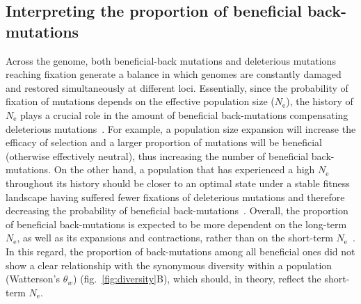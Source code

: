 \documentclass{article}
\newcommand{\Ne}{N_{\text{e}}}
\begin{document}
    \subsection*{Interpreting the proportion of beneficial back-mutations}

    Across the genome, both beneficial-back mutations and deleterious mutations reaching fixation generate a balance in which genomes are constantly damaged and restored simultaneously at different loci.
    Essentially, since the probability of fixation of mutations depends on the effective population size ($\Ne$), the history of $\Ne$ plays a crucial role in the amount of beneficial back-mutations compensating deleterious mutations~\cite{latrille_inferring_2021}.
    For example, a population size expansion will increase the efficacy of selection and a larger proportion of mutations will be beneficial (otherwise effectively neutral), thus increasing the number of beneficial back-mutations.
    On the other hand, a population that has experienced a high $\Ne$ throughout its history should be closer to an optimal state under a stable fitness landscape having suffered fewer fixations of deleterious mutations and therefore decreasing the probability of beneficial back-mutations~\cite{huber_determining_2017}.
    Overall, the proportion of beneficial back-mutations is expected to be more dependent on the long-term $\Ne$, as well as its expansions and contractions, rather than on the short-term $\Ne$~\cite{charlesworth_other_2007,huber_determining_2017}.
    In this regard, the proportion of back-mutations among all beneficial ones did not show a clear relationship with the synonymous diversity within a population (Watterson's $\theta_w$) (fig.~\ref{fig:diversity}B), which should, in theory, reflect the short-term $\Ne$.

\end{document}
